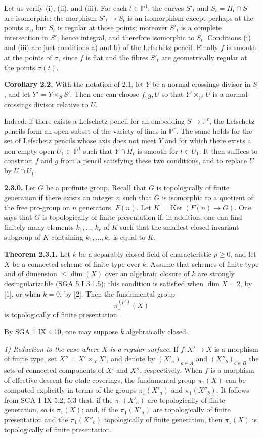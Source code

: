 \documentclass[11pt]{article}
\providecommand{\Ker}{\operatorname{Ker}}
\begin{document}
Let us verify (i), (ii), and (iii). For each $t\in\mathbb P^1$, the curves $S'_t$ and $S_t=H_t\cap S$ are isomorphic: the morphism $S'_t\to S_t$ is an isomorphism except perhaps at the points $x_i$, but $S_t$ is regular at those points; moreover $S'_t$ is a complete intersection in $S'$, hence integral, and therefore isomorphic to $S_t$. Conditions (i) and (iii) are just conditions a) and b) of the Lefschetz pencil. Finally $f$ is smooth at the points of $\sigma$, since $f$ is flat and the fibres $S'_t$ are geometrically regular at the points $\sigma(t)$.

\textbf{Corollary 2.2.} With the notation of 2.1, let $Y$ be a normal-crossings divisor in $S$, and let $Y'=Y\times_S S'$. Then one can choose $f,g,U$ so that $Y'\times_{\mathbb P^1}U$ is a normal-crossings divisor relative to $U$.

Indeed, if there exists a Lefschetz pencil for an embedding $S\to\mathbb P^r$, the Lefschetz pencils form an open subset of the variety of lines in $\mathbb P^r$. The same holds for the set of Lefschetz pencils whose axis does not meet $Y$ and for which there exists a non-empty open $U_1\subset\mathbb P^1$ such that $Y\cap H_t$ is smooth for $t\in U_1$. It then suffices to construct $f$ and $g$ from a pencil satisfying these two conditions, and to replace $U$ by $U\cap U_1$.

\textbf{2.3.0.} Let $G$ be a profinite group. Recall that $G$ is topologically of finite generation if there exists an integer $n$ such that $G$ is isomorphic to a quotient of the free pro-group on $n$ generators, $F(n)$. Let $K=\Ker(F(n)\to G)$. One says that $G$ is topologically of finite presentation if, in addition, one can find finitely many elements $k_1,\ldots,k_r$ of $K$ such that the smallest closed invariant subgroup of $K$ containing $k_1,\ldots,k_r$ is equal to $K$.

\textbf{Theorem 2.3.1.} Let $k$ be a separably closed field of characteristic $p\ge0$, and let $X$ be a connected scheme of finite type over $k$. Assume that schemes of finite type and of dimension $\le \dim(X)$ over an algebraic closure of $k$ are strongly desingularizable (SGA 5 I 3.1.5); this condition is satisfied when $\dim X=2$, by [1], or when $k=0$, by [2]. Then the fundamental group
\[
 \pi_1^{(p')}(X)
\]
is topologically of finite presentation.

By SGA 1 IX 4.10, one may suppose $k$ algebraically closed.

\emph{1) Reduction to the case where $X$ is a regular surface.} If $f:X'\to X$ is a morphism of finite type, set $X''=X'\times_X X'$, and denote by $(X'_a)_{a\in A}$ and $(X''_b)_{b\in B}$ the sets of connected components of $X'$ and $X''$, respectively. When $f$ is a morphism of effective descent for etale coverings, the fundamental group $\pi_1(X)$ can be computed explicitly in terms of the groups $\pi_1(X'_a)$ and $\pi_1(X''_b)$. It follows from SGA 1 IX 5.2, 5.3 that, if the $\pi_1(X'_a)$ are topologically of finite generation, so is $\pi_1(X)$; and, if the $\pi_1(X'_a)$ are topologically of finite presentation and the $\pi_1(X''_b)$ topologically of finite generation, then $\pi_1(X)$ is topologically of finite presentation.
\end{document}
